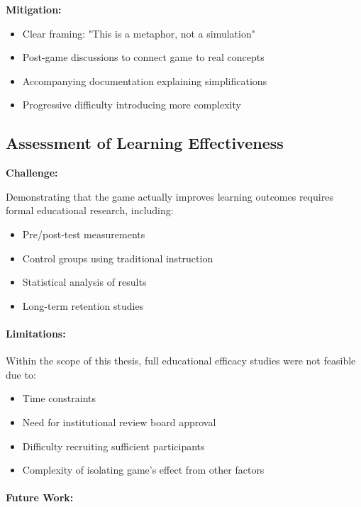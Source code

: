 \textbf{Mitigation:}

\begin{itemize}
    \item Clear framing: "This is a metaphor, not a simulation"
    \item Post-game discussions to connect game to real concepts
    \item Accompanying documentation explaining simplifications
    \item Progressive difficulty introducing more complexity
\end{itemize}

\subsection{Assessment of Learning Effectiveness}
\label{subsec:learning-assessment}

\textbf{Challenge:}

Demonstrating that the game actually improves learning outcomes requires formal educational research, including:
\begin{itemize}
    \item Pre/post-test measurements
    \item Control groups using traditional instruction
    \item Statistical analysis of results
    \item Long-term retention studies
\end{itemize}

\paragraph*{Limitations:}

Within the scope of this thesis, full educational efficacy studies were not feasible due to:
\begin{itemize}
    \item Time constraints
    \item Need for institutional review board approval
    \item Difficulty recruiting sufficient participants
    \item Complexity of isolating game's effect from other factors
\end{itemize}

\paragraph*{Future Work:}

